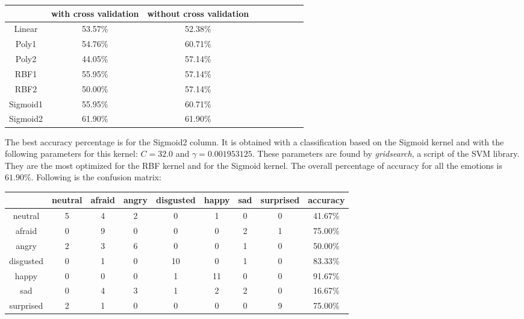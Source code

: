 \vspace{\baselineskip}
\begin {center}
\begin{tabular}{|c|c|c|c|c|c|c|c|c|}
  \hline
    & with cross validation & without cross validation \\
  \hline
  Linear & 53.57\% & 52.38\% \\
  Poly1 & 54.76\% & 60.71\% \\
  Poly2 & 44.05\% & 57.14\% \\
  RBF1 & 55.95\% & 57.14\% \\
  RBF2 & 50.00\% & 57.14\% \\
  Sigmoid1 & 55.95\% & 60.71\% \\
  Sigmoid2 & 61.90\% & 61.90\% \\
  \hline
\end{tabular}
\end {center}

\vspace{\baselineskip}
\vspace{\baselineskip}
\noindent The best accuracy percentage is for the Sigmoid2 column. It is obtained with a classification based on the Sigmoid kernel and with the following parameters for this kernel: $ C = 32.0 $ and $ \gamma = 0.001953125 $. These parameters are found by \textit{gridsearch}, a script of the SVM library. They are the most optimized for the RBF kernel and for the Sigmoid kernel. The overall percentage of accuracy for all the emotions is $ 61.90\% $. Following is the confusion matrix:
\newline

\vspace{\baselineskip}
\begin {center}
\begin{tabular}{|c|c|c|c|c|c|c|c|c|}
  \hline
   & neutral & afraid & angry & disgusted & happy & sad & surprised & accuracy \\
  \hline
  neutral & 5 & 4 & 2 & 0 & 1 & 0 & 0 & 41.67\% \\
  afraid & 0 & 9 & 0 & 0 & 0 & 2 & 1 & 75.00\% \\
  angry & 2 & 3 & 6 & 0 & 0 & 1 & 0 & 50.00\% \\
  disgusted & 0 & 1 & 0 & 10 & 0 & 1 & 0 & 83.33\% \\
  happy & 0 & 0 & 0 & 1 & 11 & 0 & 0 & 91.67\% \\
  sad & 0 & 4 & 3 & 1 & 2 & 2 & 0 & 16.67\% \\
  surprised & 2 & 1 & 0 & 0 & 0 & 0 & 9 & 75.00\%\\
  \hline
\end{tabular}
\end {center}


